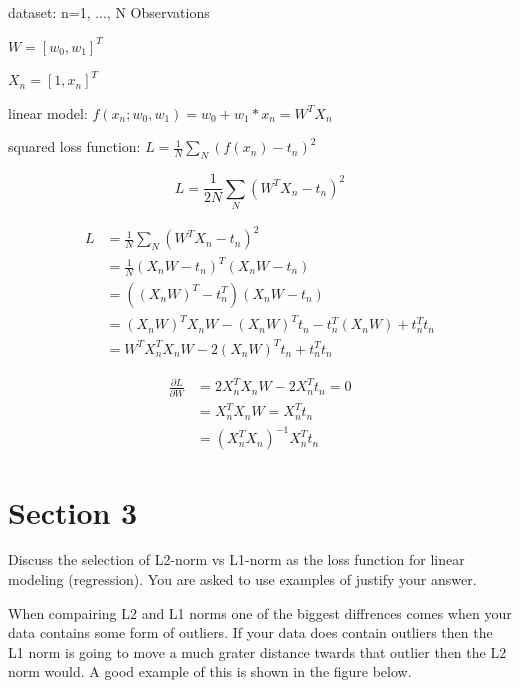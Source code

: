 \documentclass{report}
\begin{document}
\vspace{5mm}

dataset: n=1, ..., N Observations

$W = [w_0, w_1]^T$

$X_n = [1, x_n]^T$

linear model: $f(x_n; w_0, w_1) = w_0+w_1*x_n = W^TX_n$

squared loss function: $L = \frac{1}{N} \sum_{N} (f(x_n) - t_n)^2$

$$L = \frac{1}{2N} \sum_{N} (W^TX_n - t_n)^2$$

\begin{equation} \label{eq1}
\begin{split}
L & = \frac{1}{N} \sum_{N} (W^TX_n - t_n)^2\\
  & = \frac{1}{N} (X_nW - t_n)^T(X_nW-t_n) \\
  & = ((X_nW)^T - t_n^T)(X_nW-t_n) \\
  & = (X_nW)^T X_nW - (X_nW)^Tt_n - t_n^T(X_nW) + t_n^Tt_n \\
  & = W^TX_n^TX_nW - 2(X_nW)^Tt_n + t_n^Tt_n
\end{split}
\end{equation}

\begin{equation} \label{eq2}
\begin{split}
\frac{\partial L}{\partial W}  & = 2X_n^TX_nW - 2X_n^Tt_n = 0 \\
                               & = X_n^TX_nW = X_n^Tt_n \\
                               & = (X_n^TX_n)^{-1}X_n^Tt_n
\end{split}
\end{equation}

\chapter{Section 3}
Discuss the selection of L2-norm vs L1-norm as the loss function for linear modeling (regression). You are asked to use examples of justify your answer.

When compairing L2 and L1 norms one of the biggest diffrences comes when your data contains some form of outliers. If your data does contain outliers then the L1 norm is going to move a much grater distance twards that outlier then the L2 norm would. A good example of this is shown in the figure below.
\end{document}
